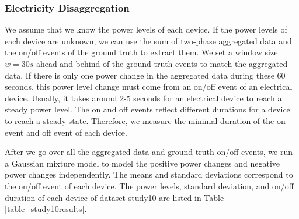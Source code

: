 \subsubsection{Electricity Disaggregation}
We assume that we know the power levels of each device. 
If the power levels of each device are unknown, 
we can use the sum of two-phase aggregated data and the on/off events of the 
ground truth to extract them. 
We set a window size $w=30s$ ahead and behind of the ground truth events to match 
the aggregated data.
If there is only one power change in the aggregated data during these 60 seconds, 
this power level change must come from an on/off event of an electrical device. 
Usually, it takes around 2-5 seconds for an electrical device to reach
a steady power level. 
The on and off events reflect different durations for a device to 
reach a steady state. 
Therefore, we measure the minimal duration of the on event and off event 
of each device. 

After we go over all the aggregated data and ground truth on/off events, 
we run a Gaussian mixture model to model the positive power changes and negative power changes
independently. The means and standard deviations correspond to  the on/off event of each device. 
The power levels, standard deviation, and on/off duration of each device of dataset study10 are listed in Table \ref{table_study10results}.


